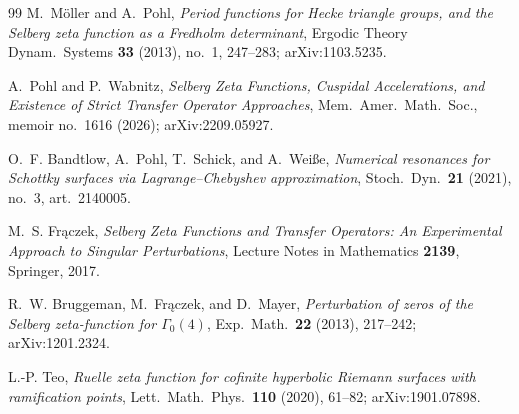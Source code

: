 \documentclass[11pt]{article}
\theoremstyle{definition}
\theoremstyle{remark}
\begin{document}
\begin{thebibliography}{99}
M.~M\"oller and A.~Pohl,
\emph{Period functions for Hecke triangle groups, and the Selberg zeta
function as a Fredholm determinant},
Ergodic Theory Dynam.\ Systems \textbf{33} (2013), no.~1, 247--283;
arXiv:1103.5235.

A.~Pohl and P.~Wabnitz, %
\emph{Selberg Zeta Functions, Cuspidal Accelerations, and Existence of
Strict Transfer Operator Approaches},
Mem.\ Amer.\ Math.\ Soc., memoir no.~1616 (2026); arXiv:2209.05927.

O.~F. Bandtlow, A.~Pohl, T.~Schick, and A.~Wei{\ss}e,
\emph{Numerical resonances for Schottky surfaces via
Lagrange--Chebyshev approximation},
Stoch.\ Dyn.\ \textbf{21} (2021), no.~3, art.~2140005.

M.~S. Fr\k{a}czek,
\emph{Selberg Zeta Functions and Transfer Operators: An Experimental
Approach to Singular Perturbations},
Lecture Notes in Mathematics \textbf{2139}, Springer, 2017.

R.~W. Bruggeman, M.~Fr\k{a}czek, and D.~Mayer,
\emph{Perturbation of zeros of the Selberg zeta-function for
$\Gamma_0(4)$},
Exp.\ Math.\ \textbf{22} (2013), 217--242; arXiv:1201.2324.

L.-P. Teo,
\emph{Ruelle zeta function for cofinite hyperbolic Riemann surfaces with
ramification points},
Lett.\ Math.\ Phys.\ \textbf{110} (2020), 61--82; arXiv:1901.07898.


\end{thebibliography}
\end{document}
